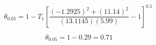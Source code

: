 \documentclass[12pt]{article}
\begin{document}
\pagestyle{empty}
\Large
{}
\pagecolor{ehandbook}


\boldmath

\[
\theta_{0.05} = 1 - T_{1} \left[
\frac{(-1.2925)^2 + (11.14)^{2}}{(13.1145)(5.99)} - 1 
\right]^{0.5} \
\]



\[
\theta_{0.05} = 1 - 0.29 = 0.71
\]
\end{document}
